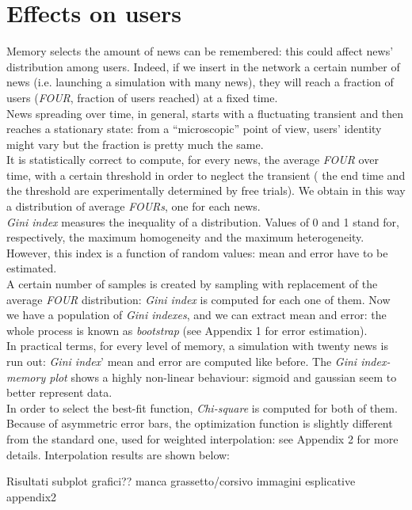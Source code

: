 \section{Effects on users}
Memory selects the amount of news can be remembered: this could affect news' distribution among users.
Indeed, if we insert in the network a certain number of news (i.e. launching a simulation with many news), they will reach a fraction of users (\textit{FOUR}, fraction of users reached) at a fixed time.\\
News spreading over time, in general, starts with a fluctuating transient and then reaches a stationary state: from a ``microscopic'' point of view, users' identity might vary but the fraction is pretty much the same. \\
It is statistically correct to compute, for every news, the average \textit{FOUR} over time, with a certain threshold in order to neglect the transient ( the end time and the threshold are experimentally determined by free trials).
We obtain in this  way a distribution of average \textit{FOURs}, one for each news.\\
\textit{Gini index} measures the inequality of a distribution. Values of 0 and 1 stand for, respectively, the maximum homogeneity and the maximum heterogeneity.
However, this index is a function of random values: mean and error have to be estimated.\\
A certain number of samples is created by sampling with replacement of the average \textit{FOUR} distribution: \textit{Gini index} is computed for each one of them.
Now we have a population of \textit{Gini indexes}, and we can extract mean and error: the whole process is known as \textit{bootstrap} (see Appendix 1 for error estimation).\\
In practical terms, for every level of  memory, a simulation with twenty news is run out: \textit{Gini index}' mean and error are computed like before.
The \textit{Gini index-memory plot} shows a highly non-linear behaviour: sigmoid and gaussian seem to better represent data.\\
 In order to select the best-fit function, \textit{Chi-square} is computed for both of them. \\
Because of asymmetric error bars, the optimization function is slightly different from the standard one, used for weighted interpolation: see Appendix 2 for more details.
Interpolation results are shown below:


Risultati
subplot grafici??
manca grassetto/corsivo
immagini esplicative appendix2
